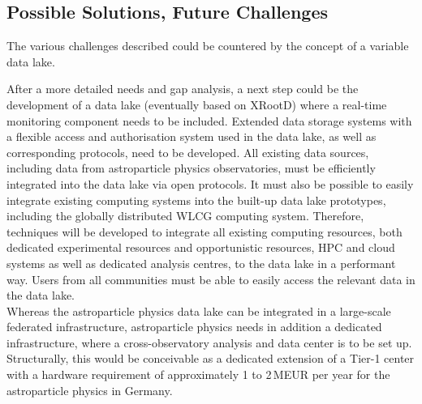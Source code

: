 \subsection{Possible Solutions, Future Challenges}

The various challenges described could be countered by the concept of a variable data lake. 

After a more detailed needs and gap analysis, a next step could be the
development of a data lake (eventually based on XRootD) where a real-time monitoring component needs to be included. 
Extended data storage systems with a flexible access and authorisation system used in the data lake, as well as corresponding protocols, need to be developed. 
All existing data sources, including data from astroparticle physics observatories, must be efficiently integrated into the data lake via open protocols. It must also be possible to easily integrate existing computing systems into the built-up data lake prototypes, including the globally distributed WLCG computing system. 
Therefore, techniques will be developed to integrate all existing computing resources, both dedicated experimental resources and opportunistic resources, HPC and cloud systems as well as dedicated analysis centres, to the data lake in a performant way. 
Users from all communities must be able to easily access the relevant data in the data lake. \\

Whereas the astroparticle physics data lake can be integrated in a large-scale federated infrastructure, astroparticle physics needs in addition a dedicated infrastructure, where a cross-observatory analysis and data center is to be set up. 
Structurally, this would be conceivable as a dedicated extension of a Tier-1
center with a hardware requirement of approximately 1 to 2\,MEUR per year for the astroparticle physics in Germany.












